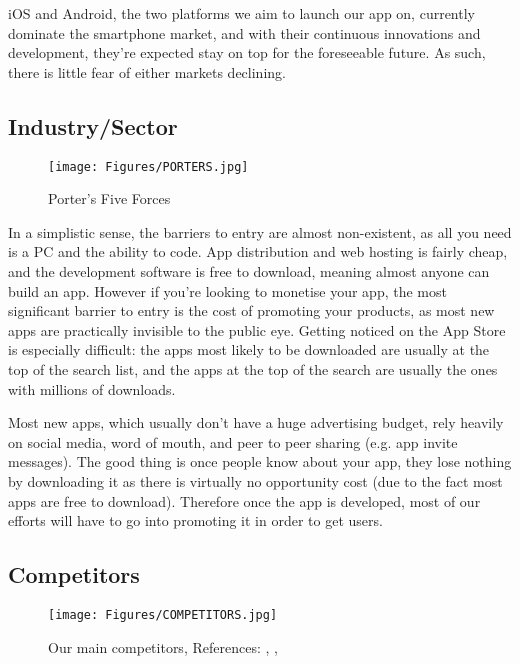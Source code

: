 \documentclass[12pt]{article}
\begin{document}
iOS and Android, the two platforms we aim to launch our app on, currently dominate the smartphone market, and with their continuous innovations and development, they’re expected stay on top for the foreseeable future. As such, there is little fear of either markets declining.

\subsection{Industry/Sector}

\begin{figure}
    \centering
    \texttt{[image: Figures/PORTERS.jpg]}
    \caption{Porter’s Five Forces \cite{Burns2014}}
    \label{fig:porters}
\end{figure}

In a simplistic sense, the barriers to entry are almost non-existent, as all you need is a PC and the ability to code. App distribution and web hosting is fairly cheap, and the development software is free to download, meaning almost anyone can build an app. However if you're looking to monetise your app,  the most significant barrier to entry is the cost of promoting your products, as most new apps are practically invisible to the public eye. Getting noticed on the App Store is especially difficult: the apps most likely to be downloaded are usually at the top of the search list, and the apps at the top of the search are usually the ones with millions of downloads.
 
Most new apps, which usually don't have a huge advertising budget, rely heavily on social media, word of mouth, and peer to peer sharing (e.g. app invite messages). The good thing is once people know about your app, they lose nothing by downloading it as there is virtually no opportunity cost (due to the fact most apps are free to download). Therefore once the app is developed, most of our efforts will have to go into promoting it in order to get users.

\subsection{Competitors}

\begin{figure}
    \centering
    \texttt{[image: Figures/COMPETITORS.jpg]}
    \caption{Our main competitors, References: \cite{Shontell2015}, \cite{Facebookn.d.}, \cite{WhatsAppn.d.}
}
    \label{fig:competitors}
\end{figure}
\end{document}
